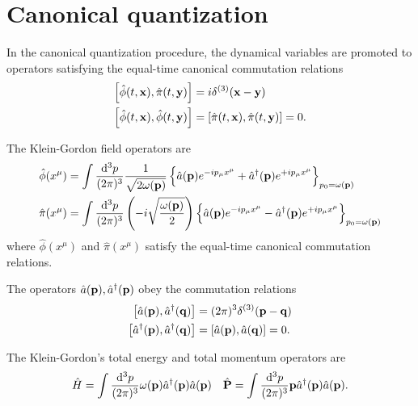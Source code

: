 \section{Canonical quantization}

\begin{definition}
	In the canonical quantization procedure, the dynamical variables are promoted to operators satisfying the equal-time canonical commutation relations
	\begin{align}
		\comm{\hat\phi(t,\vb{x})}{\hat\pi(t,\vb{y})}
		&=
		i\delta^{(3)}(\vb{x}-\vb{y})
		\\
		\comm{\hat\phi(t,\vb{x})}{\hat\phi(t,\vb{y})}
		&=
		\comm{\hat\pi(t,\vb{x})}{\hat\pi(t,\vb{y})}
		=
		0
		\label{eq:qkg_comm_pm}
		.
	\end{align}
\end{definition}
\begin{theorem}
	The Klein-Gordon field operators are
	\begin{align}
		\hat\phi(x^\mu)
		&=
		\int\frac{\dd[3]{p}}{(2\pi)^3}
		\frac{1}{\sqrt{2\omega(\vb{p})}}
		\left\{
			\hat{a}(\vb{p})
			e^{-ip_\mu x^\mu}
			+
			\hat{a}^\dagger(\vb{p})
			e^{+ip_\mu x^\mu}
		\right\}_{p_0=\omega(\vb{p})}
		\label{eq:qkg_pos}
		\\
		\hat\pi(x^\mu)
		&=
		\int\frac{\dd[3]{p}}{(2\pi)^3}
		\left(-i\sqrt{\frac{\omega(\vb{p})}{2}}\right)
		\left\{
			\hat{a}(\vb{p})
			e^{-ip_\mu x^\mu}
			-
			\hat{a}^\dagger(\vb{p})
			e^{+ip_\mu x^\mu}
		\right\}_{p_0=\omega(\vb{p})}
		\label{eq:qkg_mom}
	\end{align}
	where $\hat\phi(x^\mu)$ and $\hat\pi(x^\mu)$ satisfy the equal-time canonical commutation relations.
\end{theorem}
\begin{theorem}\label{thm:kg_comm_ac}
	The operators $\hat{a}(\vb{p}),\hat{a}^\dagger(\vb{p})$ obey the commutation relations
	\begin{align}
		\comm{\hat{a}(\vb{p})}{\hat{a}^\dagger(\vb{q})}
		&=
		(2\pi)^3
		\delta^{(3)}(\vb{p}-\vb{q})
		\\
		\comm{\hat{a}^\dagger(\vb{p})}{\hat{a}^\dagger(\vb{q})}
		&=
		\comm{\hat{a}(\vb{p})}{\hat{a}(\vb{q})}
		=
		0
		\label{eq:kg_comm_ac}
		.
	\end{align}	
\end{theorem}
\begin{definition}
	The Klein-Gordon's total energy and total momentum operators are
	\begin{align}
		\hat{H}
		=
		\int\frac{\dd[3]{p}}{(2\pi)^3}
		\omega(\vb{p})\hat{a}^\dagger(\vb{p})\hat{a}(\vb{p})
		&&
		\hat{\vb{P}}
		=
		\int\frac{\dd[3]{p}}{(2\pi)^3}
		\vb{p}\hat{a}^\dagger(\vb{p})\hat{a}(\vb{p})
		\label{eq:qkg_energy_momentum}
		.
	\end{align}
\end{definition}
